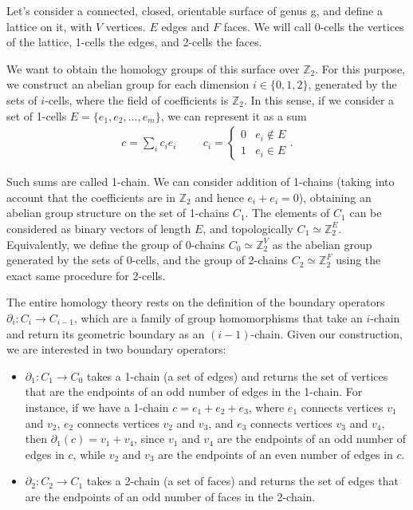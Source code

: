 \documentclass[12pt, twoside, openany]{book}
\begin{document}
Let's consider a connected, closed, orientable surface of genus g, and define a lattice on it, with $V$ vertices. $E$ edges and $F$ faces. We will call 0-cells the vertices of the lattice, 1-cells the edges, and 2-cells the faces. 

We want to obtain the homology groups of this surface over $\mathbb{Z}_2$. For this purpose, we construct an abelian group for each dimension $i \in \{0, 1, 2\}$, generated by the sets of $i$-cells, where the field of coefficients is $\mathbb{Z}_2$. In this sense, if we consider a set of 1-cells $E = \{ e_1, e_2, \ldots, e_m \}$, we can represent it as a sum 
\begin{align}
    c = \sum_{i} c_i e_i \hspace{1cm} c_i = \begin{cases} 
0 & e_i \notin E \\ 
1 & e_i \in E 
\end{cases}.
\end{align}

Such sums are called 1-chain. We can consider addition of 1-chains (taking into account that the coefficients are in $\mathbb{Z}_2$ and hence $e_i + e_i = 0$), obtaining an abelian group structure on the set of 1-chains $C_1$. The elements of $C_1$ can be considered as binary vectors of length $E$, and topologically $C_1 \simeq \mathbb{Z}_2^E$. Equivalently, we define the group of 0-chains $C_0 \simeq \mathbb{Z}_2^V$ as the abelian group generated by the sets of 0-cells, and the group of 2-chains $C_2 \simeq \mathbb{Z}_2^F$ using the exact same procedure for 2-cells. 

The entire homology theory rests on the definition of the boundary operators $\partial_i : C_i \rightarrow C_{i-1}$, which are a family of group homomorphisms that take an $i$-chain and return its geometric boundary as an $(i-1)$-chain. Given our construction, we are interested in two boundary operators:
\begin{itemize}
    \item $\partial_1 : C_1 \rightarrow C_0$ takes a 1-chain (a set of edges) and returns the set of vertices that are the endpoints of an odd number of edges in the 1-chain. For instance, if we have a 1-chain $c = e_1 + e_2 + e_3$, where $e_1$ connects vertices $v_1$ and $v_2$, $e_2$ connects vertices $v_2$ and $v_3$, and $e_3$ connects vertices $v_3$ and $v_4$, then $\partial_1(c) = v_1 + v_4$, since $v_1$ and $v_4$ are the endpoints of an odd number of edges in $c$, while $v_2$ and $v_3$ are the endpoints of an even number of edges in $c$.
    \item $\partial_2 : C_2 \rightarrow C_1$ takes a 2-chain (a set of faces) and returns the set of edges that are the endpoints of an odd number of faces in the 2-chain.
\end{itemize}
\end{document}
